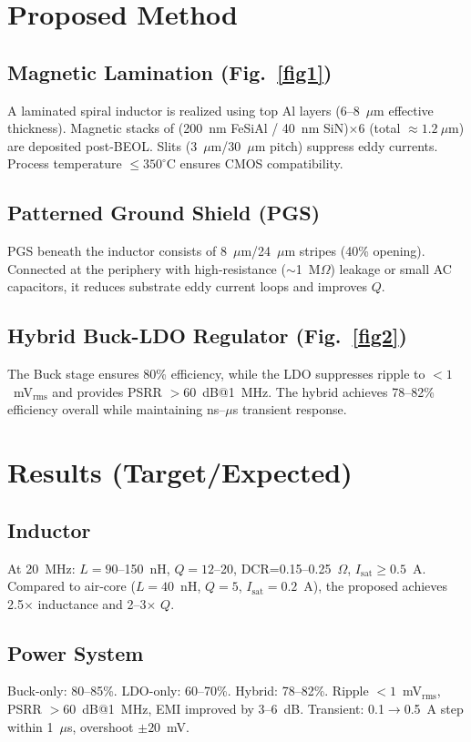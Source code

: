 \documentclass[conference]{IEEEtran}
\begin{document}
\section{Proposed Method}

\subsection{Magnetic Lamination (Fig.~\ref{fig1})}
A laminated spiral inductor is realized using top Al layers (6--8~$\mu$m effective thickness). 
Magnetic stacks of (200~nm FeSiAl / 40~nm SiN)$\times6$ (total $\approx1.2~\mu$m) are deposited post-BEOL. 
Slits (3~$\mu$m/30~$\mu$m pitch) suppress eddy currents. 
Process temperature $\le350^\circ$C ensures CMOS compatibility.

\subsection{Patterned Ground Shield (PGS)}
PGS beneath the inductor consists of 8~$\mu$m/24~$\mu$m stripes (40\% opening). 
Connected at the periphery with high-resistance ($\sim$1~M$\Omega$) leakage or small AC capacitors, it reduces substrate eddy current loops and improves $Q$.

\subsection{Hybrid Buck-LDO Regulator (Fig.~\ref{fig2})}
The Buck stage ensures 80\% efficiency, while the LDO suppresses ripple to $<1$~mV$_{\mathrm{rms}}$ and provides PSRR $>60$~dB@1~MHz. 
The hybrid achieves 78--82\% efficiency overall while maintaining ns--$\mu$s transient response.

\section{Results (Target/Expected)}

\subsection{Inductor}
At 20~MHz: $L=90$--150~nH, $Q=12$--20, DCR=0.15--0.25~$\Omega$, $I_{\mathrm{sat}}\ge0.5$~A.  
Compared to air-core ($L=40$~nH, $Q=5$, $I_{\mathrm{sat}}=0.2$~A), the proposed achieves 2.5$\times$ inductance and 2--3$\times$ $Q$.

\subsection{Power System}
Buck-only: 80--85\%.  
LDO-only: 60--70\%.  
Hybrid: 78--82\%.  
Ripple $<1$~mV$_{\mathrm{rms}}$, PSRR $>60$~dB@1~MHz, EMI improved by 3--6~dB.  
Transient: 0.1$\to$0.5~A step within 1~$\mu$s, overshoot $\pm20$~mV.
\end{document}

